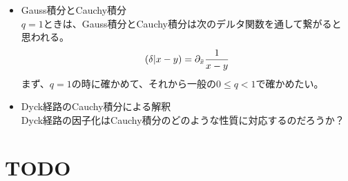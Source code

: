 {	\begin{todo}[課題]\label{todo:課題} %
		\begin{itemize}\setlength{\itemsep}{-1mm} %
			\item Gauss積分とCauchy積分 \\
			$q=1$ときは、Gauss積分とCauchy積分は次のデルタ関数を通して繋がると
			思われる。
			\begin{equation*}\begin{split}
				\left({\delta| x - y}\right) = \partial_{\bar{x}}\frac{1}{x - y}
			\end{split}\end{equation*}
			まず、$q=1$の時に確かめて、それから一般の$0\le q<1$で確かめたい。
			\item Dyck経路のCauchy積分による解釈 \\
			Dyck経路の因子化はCauchy積分のどのような性質に対応するのだろうか？
		\end{itemize} %
	\end{todo} %
\section{TODO}\label{s1:TODO} %
}
